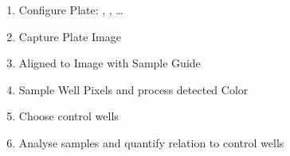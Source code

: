 \begin{enumerate}
    \item Configure Plate: , , \ldots
    \item Capture Plate Image
    \item Aligned to Image with Sample Guide
    \item Sample Well Pixels and process detected Color
    \item Choose control wells
    \item Analyse samples and quantify relation to control wells
\end{enumerate}